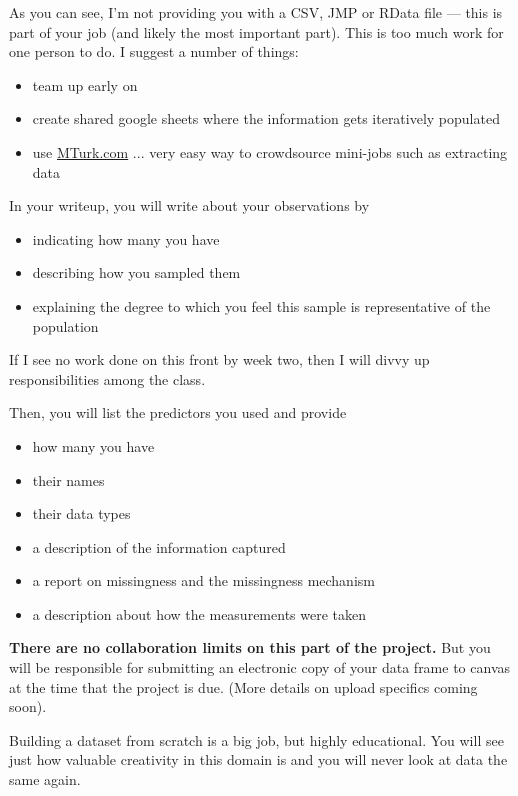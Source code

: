 \documentclass[12pt]{article}
\begin{document}
As you can see, I'm not providing you with a CSV, JMP or RData file --- this is part of your job (and likely the most important part). This is too much work for one person to do. I suggest a number of things:

\begin{itemize}
\item team up early on
\item create shared google sheets where the information gets iteratively populated
\item use \url{MTurk.com} ... very easy way to crowdsource mini-jobs such as extracting data
\end{itemize}

In your writeup, you will write about your observations by

\begin{itemize}
\item indicating how many you have
\item describing how you sampled them
\item explaining the degree to which you feel this sample is representative of the population
\end{itemize}


\noindent If I see no work done on this front by week two, then I will divvy up responsibilities among the class. 

\noindent Then, you will list the predictors you used and provide

\begin{itemize}
\item how many you have
\item their names
\item their data types
\item a description of the information captured
\item a report on missingness and the missingness mechanism
\item a description about how the measurements were taken
\end{itemize}


\textbf{There are no collaboration limits on this part of the project.} But you will be responsible for submitting an electronic copy of your data frame to canvas at the time that the project is due. (More details on upload specifics coming soon).

Building a dataset from scratch is a big job, but highly educational. You will see just how valuable creativity in this domain is and you will never look at data the same again.
\end{document}
